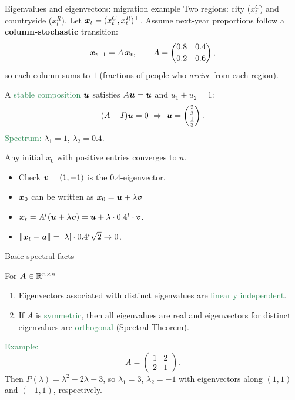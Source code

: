 \documentclass{beamer}
\begin{document}
\begin{frame}{Eigenvalues and eigenvectors: migration example}
\small
Two regions: city ($x_t^C$) and countryside ($x_t^R$). Let $\boldsymbol x_t=(x_t^C,x_t^R)^\top$.
Assume next-year proportions follow a \textbf{column-stochastic} transition:
\[
\boldsymbol x_{t+1}=A\,\boldsymbol x_t,
\qquad
A=\begin{pmatrix}0.8&0.4\\[2pt] 0.2&0.6\end{pmatrix},
\]
so each column sums to $1$ (fractions of people who \emph{arrive} from each region).
\medskip

A \textcolor{SeaGreen}{stable composition} $\boldsymbol u$ satisfies $A\boldsymbol u=\boldsymbol u$ and $u_1+u_2=1$:
\[
(A-I)\boldsymbol u=0
\ \Rightarrow\
\boldsymbol u=\begin{pmatrix}\tfrac{2}{3}\\[2pt]\tfrac{1}{3}\end{pmatrix}.
\]
\textcolor{SeaGreen}{Spectrum:} $\lambda_1=1$, $\lambda_2=0.4$.
\medskip

\begin{block}{Any initial $x_0$ with positive entries converges to $u$.}\small
	\begin{itemize}
		\item Check $\boldsymbol v=(1,-1)$ is the $0.4$-eigenvector.\\[1mm]
		\item $\boldsymbol x_0$ can be written as $\boldsymbol x_0=\boldsymbol u+\lambda \boldsymbol v$\\[1mm]
		\item $\boldsymbol x_t=A^t(\boldsymbol u+\lambda \boldsymbol v)=\boldsymbol u+\lambda\cdot 0.4^t\cdot \boldsymbol v$.\\[1mm]
		\item $\|\boldsymbol x_t-\boldsymbol u\|=|\lambda| \cdot 0.4^t \sqrt{2}\to 0$.\\[1mm]
	\end{itemize}
\end{block}
\end{frame}


\begin{frame}{Basic spectral facts}
\begin{block}{For $A\in\mathbb R^{n\times n}$}
\begin{enumerate}
\item Eigenvectors associated with distinct eigenvalues are \textcolor{SeaGreen}{linearly independent}.
\item If $A$ is \textcolor{SeaGreen}{symmetric}, then all eigenvalues are real and eigenvectors for distinct eigenvalues are \textcolor{SeaGreen}{orthogonal} (Spectral Theorem).
\end{enumerate}
\end{block}

\medskip
\textcolor{SeaGreen}{Example:}
\[
A=\begin{pmatrix}1&2\\ 2&1\end{pmatrix}.
\]
Then $P(\lambda)=\lambda^2-2\lambda-3$, so $\lambda_1=3$, $\lambda_2=-1$ with eigenvectors along $(1,1)$ and $(-1,1)$, respectively.
\end{frame}
\end{document}
